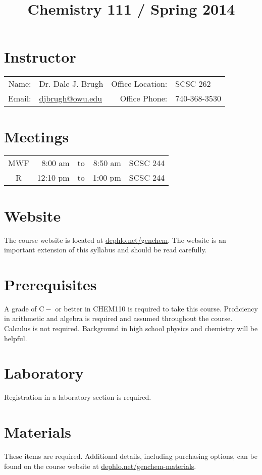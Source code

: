 \documentclass[letterpaper,oneside,onecolumn,11pt,article]{memoir}
\title{Chemistry 111 / Spring 2014}
\date{}
\author{}
\begin{document}
\maketitle
\thispagestyle{courseinformationtitle}

\section{Instructor}
\begin{tabular}{rl|rl}
Name: & Dr. Dale J. Brugh & Office Location: & SCSC 262 \\
Email: & \href{mailto:djbrugh@owu.edu}{djbrugh@owu.edu} & Office Phone: & 740-368-3530 \\
\end{tabular}

\section{Meetings}
\begin{tabular}{crcrl}
MWF & 8:00 am & to & 8:50 am & SCSC 244 \\
R & 12:10 pm & to & 1:00 pm & SCSC 244
\end{tabular}

\section{Website}
The course website is located at \href{http://dephlo.net/genchem}{dephlo.net/genchem}. The website is an important extension of this syllabus and should be read carefully. 

\section{Prerequisites}
A grade of $\mathrm{C}-$ or better in CHEM110 is required to take this course. Proficiency in arithmetic and algebra is required and assumed throughout the course. Calculus is not required. Background in high school physics and chemistry will be helpful. 

\section{Laboratory}
Registration in a laboratory section is required. 

\section{Materials}
These items are required. Additional details, including purchasing options, can be found on the course website at \href{http://dephlo.net/genchem-materials}{dephlo.net/genchem-materials}.
\end{document}
